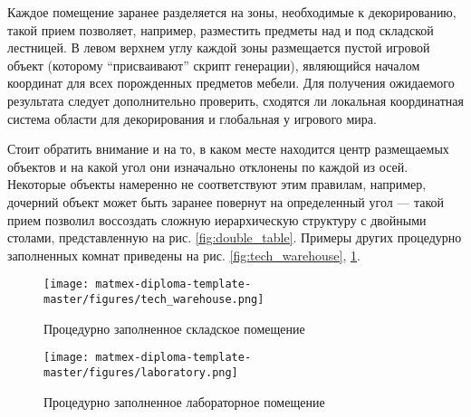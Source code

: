 Каждое помещение заранее разделяется на зоны, необходимые к декорированию, такой прием позволяет, например, разместить предметы над и под складской лестницей. В левом верхнем углу каждой зоны размещается пустой игровой объект (которому \enquote{присваивают} скрипт генерации), являющийся началом координат для всех порожденных предметов мебели. Для получения ожидаемого результата следует дополнительно проверить, сходятся ли локальная координатная система области для декорирования и глобальная у игрового мира. 

Стоит обратить внимание и на то, в каком месте находится центр размещаемых объектов и на какой угол они изначально отклонены по каждой из осей. Некоторые объекты намеренно не соответствуют этим правилам, например, дочерний объект может быть заранее повернут на определенный угол --- такой прием позволил воссоздать сложную иерархическую структуру с двойными столами, представленную на рис. \ref{fig:double_table}. Примеры других процедурно заполненных комнат приведены на рис. \ref{fig:tech_warehouse}, \ref{fig:laboratory}.

\begin{figure}
    \centering
    \texttt{[image: matmex-diploma-template-master/figures/tech\_warehouse.png]}
    \caption{Процедурно заполненное складское помещение}
    \label{fig:tech_warehouse}
    \texttt{[image: matmex-diploma-template-master/figures/laboratory.png]}
    \caption{Процедурно заполненное лабораторное помещение}
    \label{fig:laboratory}
\end{figure}